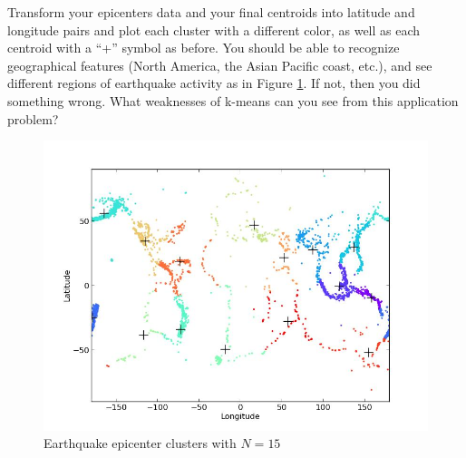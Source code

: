 \begin{problem}
Transform your epicenters data and your final centroids into latitude and longitude pairs and plot each cluster with a different color, as well as each centroid with a ``+'' symbol as before. You should be able to recognize geographical features (North America, the Asian Pacific coast, etc.), and see different regions of earthquake activity as in Figure \ref{earthquakeclusters}. If not, then you did something wrong. What weaknesses of k-means can you see from this application problem?
\end{problem}

\begin{figure} \label{earthquakeclusters}
	\centering
	\includegraphics[width=\textwidth]{clusters.jpg}
	\caption{Earthquake epicenter clusters with $N = 15$}
\end{figure}
